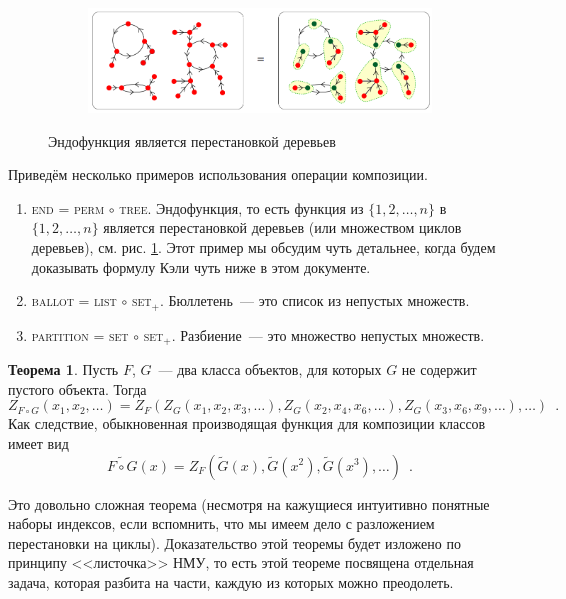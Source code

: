 \documentclass{article}
\theoremstyle{definition}
\newtheorem*{theorem}{Теорема}
\begin{document}
\begin{figure}[h]
\centering
\begin{subfigure}{.8\textwidth}
    \centering
    \includegraphics[width=\textwidth]{par_composition.png}
\end{subfigure}%
\caption{Эндофункция является перестановкой деревьев}
\label{fig:composition}	
\end{figure}

Приведём несколько примеров использования операции композиции.
\begin{enumerate}
    \item \textsc{end} = \textsc{perm} \( \circ \) \textsc{tree}. Эндофункция,
то есть функция из \(
 \{1,2,\ldots, n\}\) в \( \{1,2,\ldots, n\} \) является перестановкой деревьев (или множеством циклов
деревьев), см. рис. \ref{fig:composition}. Этот пример мы обсудим чуть
детальнее, когда будем доказывать формулу Кэли чуть ниже в этом документе.
    \item \textsc{ballot} = \textsc{list} \( \circ \) \textsc{set}$_+$.
Бюллетень~--- это список из непустых множеств.
    \item \textsc{partition} = \textsc{set} \( \circ \) \textsc{set}$_+$.
Разбиение~--- это множество непустых множеств.
\end{enumerate}

\begin{theorem}
	Пусть \( F \), \( G \)~--- два класса объектов, для 
	которых \( G \) не содержит пустого объекта. Тогда
	\[
		Z_{F \circ G}(x_1, x_2, \ldots) = Z_F(
			Z_G(x_1, x_2, x_3, \ldots),
			Z_G(x_2, x_4, x_6, \ldots),
            Z_G(x_3, x_6, x_9, \ldots),
			\ldots
		) \enspace .
	\]
	Как следствие, обыкновенная производящая функция для композиции классов имеет вид
	\[
		\widetilde{F \circ G}(x) = Z_F(\widetilde G(x), \widetilde G(x^2), 
		\widetilde G(x^3), \ldots)
		\enspace .
	\]
\end{theorem}
Это довольно сложная теорема (несмотря на кажущиеся интуитивно понятные наборы
индексов, если вспомнить, что мы имеем дело с разложением перестановки на циклы). Доказательство этой теоремы
будет изложено по принципу <<листочка>> НМУ, то
есть этой теореме посвящена отдельная задача, которая разбита на части, каждую из
которых можно преодолеть.
\end{document}
